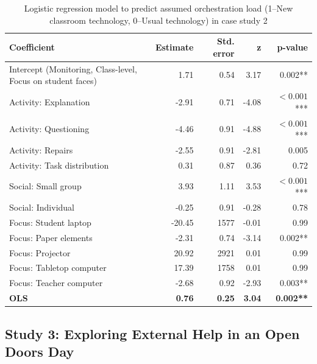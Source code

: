 \documentclass[10pt,journal,compsoc]{IEEEtran}
\begin{document}
\begin{table}[!t]
\caption{Logistic regression model to predict assumed orchestration load (1--New classroom technology, 0--Usual technology) in case study 2}
\label{tab:case2results}
\centering
\begin{tabular}{|p{2.8cm}||r|r|r|r|}
\hline
Coefficient & Estimate & Std. error & z & p-value\\
\hline
\hline
Intercept (Monitoring, Class-level, Focus on student faces) & 1.71 & 0.54 & 3.17 & 0.002** \\
Activity: Explanation & -2.91 & 0.71 & -4.08 & $<0.001$*** \\
Activity: Questioning & -4.46 & 0.91 & -4.88 & $<0.001$*** \\
Activity: Repairs & -2.55 & 0.91 & -2.81 & 0.005 \\
Activity: Task distribution & 0.31 & 0.87 & 0.36 & 0.72 \\
Social: Small group & 3.93 & 1.11 & 3.53 & $<0.001$*** \\
Social: Individual & -0.25 & 0.91 & -0.28 & 0.78 \\
Focus: Student laptop & -20.45 & 1577 & -0.01 & 0.99 \\
Focus: Paper elements & -2.31 & 0.74 & -3.14 & 0.002** \\
Focus: Projector & 20.92 & 2921 & 0.01 & 0.99 \\
Focus: Tabletop computer & 17.39 & 1758 & 0.01 & 0.99 \\
Focus: Teacher computer & -2.68 & 0.92 & -2.93 & 0.003** \\
\textbf{OLS} & \textbf{0.76} & \textbf{0.25} & \textbf{3.04} & \textbf{0.002**} \\
\hline
\end{tabular}
\end{table}


\subsection{Study 3: Exploring External Help in an Open Doors Day}
\label{sec:study3}
\end{document}
